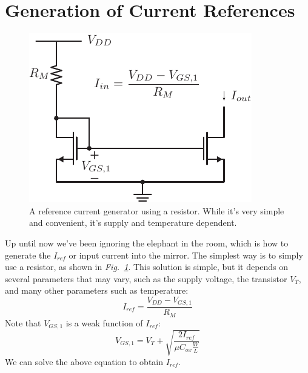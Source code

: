 \section{Generation of Current References}
\label{sec:Ireference}
\begin{figure}[tb]
\centering
\includegraphics[scale=1]{mirror_resistor.pdf}
\caption{A reference current generator using a resistor.  While it's very simple and convenient, it's supply and temperature dependent.}
\label{fig:iref_gen_rs}
\end{figure}
Up until now we've been ignoring the elephant in the room, which is how to generate the $I_{ref}$ or input current into the mirror.  The simplest way is to simply use a resistor, as shown in \emph{Fig.~\ref{fig:iref_gen_rs}}.  This solution is simple, but it depends on several parameters that may vary, such as the supply voltage, the transistor $V_T$, and many other parameters such as temperature:  
    \begin{equation}
        I_{ref} = \frac{V_{DD} - V_{GS,1}}{R_M}  
    \end{equation}
Note that $V_{GS,1}$ is a weak function of $I_{ref}$:
    \begin{equation}
        V_{GS,1} = V_T + \sqrt{\frac{2 I_{ref}}{\mu C_{ox} \frac{W}{L}}}
    \end{equation}
We can solve the above equation to obtain $I_{ref}$.
